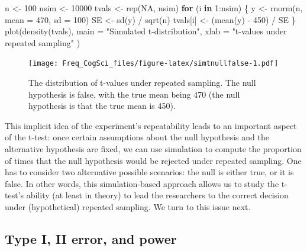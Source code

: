 \documentclass[
  12pt,
]{krantz}
\newenvironment{Shaded}{\begin{snugshade}}{\end{snugshade}}
\newcommand{\AttributeTok}[1]{\textcolor[rgb]{0.77,0.63,0.00}{#1}}
\newcommand{\ConstantTok}[1]{\textcolor[rgb]{0.00,0.00,0.00}{#1}}
\newcommand{\ControlFlowTok}[1]{\textcolor[rgb]{0.13,0.29,0.53}{\textbf{#1}}}
\newcommand{\DecValTok}[1]{\textcolor[rgb]{0.00,0.00,0.81}{#1}}
\newcommand{\FunctionTok}[1]{\textcolor[rgb]{0.00,0.00,0.00}{#1}}
\newcommand{\NormalTok}[1]{#1}
\newcommand{\OtherTok}[1]{\textcolor[rgb]{0.56,0.35,0.01}{#1}}
\newcommand{\SpecialCharTok}[1]{\textcolor[rgb]{0.00,0.00,0.00}{#1}}
\newcommand{\StringTok}[1]{\textcolor[rgb]{0.31,0.60,0.02}{#1}}
\theoremstyle{definition}
\theoremstyle{definition}
\theoremstyle{definition}
\theoremstyle{definition}
\theoremstyle{remark}
\begin{document}
\begin{Shaded}
\begin{Highlighting}[]
\NormalTok{n }\OtherTok{\textless{}{-}} \DecValTok{100}
\NormalTok{nsim }\OtherTok{\textless{}{-}} \DecValTok{10000}
\NormalTok{tvals }\OtherTok{\textless{}{-}} \FunctionTok{rep}\NormalTok{(}\ConstantTok{NA}\NormalTok{, nsim)}
\ControlFlowTok{for}\NormalTok{ (i }\ControlFlowTok{in} \DecValTok{1}\SpecialCharTok{:}\NormalTok{nsim) \{}
\NormalTok{  y }\OtherTok{\textless{}{-}} \FunctionTok{rnorm}\NormalTok{(n, }\AttributeTok{mean =} \DecValTok{470}\NormalTok{, }\AttributeTok{sd =} \DecValTok{100}\NormalTok{)}
\NormalTok{  SE }\OtherTok{\textless{}{-}} \FunctionTok{sd}\NormalTok{(y) }\SpecialCharTok{/} \FunctionTok{sqrt}\NormalTok{(n)}
\NormalTok{  tvals[i] }\OtherTok{\textless{}{-}}\NormalTok{ (}\FunctionTok{mean}\NormalTok{(y) }\SpecialCharTok{{-}} \DecValTok{450}\NormalTok{) }\SpecialCharTok{/}\NormalTok{ SE}
\NormalTok{\}}
\FunctionTok{plot}\NormalTok{(}\FunctionTok{density}\NormalTok{(tvals),}
  \AttributeTok{main =} \StringTok{"Simulated t{-}distribution"}\NormalTok{,}
  \AttributeTok{xlab =} \StringTok{"t{-}values under repeated sampling"}
\NormalTok{)}
\end{Highlighting}
\end{Shaded}

\begin{figure}
\centering
\texttt{[image: Freq\_CogSci\_files/figure-latex/simtnullfalse-1.pdf]}
\caption{\label{fig:simtnullfalse}The distribution of t-values under repeated sampling. The null hypothesis is false, with the true mean being 470 (the null hypothesis is that the true mean is 450).}
\end{figure}

This implicit idea of the experiment's repeatability leads to an important aspect of the t-test: once certain assumptions about the null hypothesis and the alternative hypothesis are fixed, we can use simulation to compute the proportion of times that the null hypothesis would be rejected under repeated sampling. One has to consider two alternative possible scenarios: the null is either true, or it is false. In other words, this simulation-based approach allows us to study the t-test's ability (at least in theory) to lead the researchers to the correct decision under (hypothetical) repeated sampling. We turn to this issue next.

\hypertarget{type-i-ii-error-and-power}{%
\subsection{Type I, II error, and power}\label{type-i-ii-error-and-power}}
\end{document}
